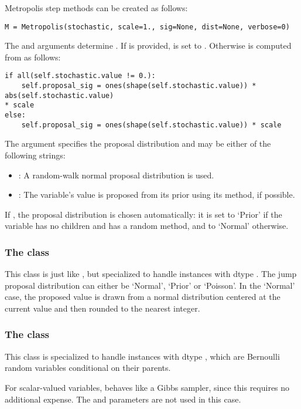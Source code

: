 Metropolis step methods can be created as follows:
\begin{verbatim}
M = Metropolis(stochastic, scale=1., sig=None, dist=None, verbose=0)
\end{verbatim}
The  and  arguments determine . If  is provided,  is set to . Otherwise  is computed from  as follows:
\begin{verbatim}
if all(self.stochastic.value != 0.):
    self.proposal_sig = ones(shape(self.stochastic.value)) * abs(self.stochastic.value) 
* scale
else:
    self.proposal_sig = ones(shape(self.stochastic.value)) * scale
\end{verbatim}

The  argument specifies the proposal distribution and may be either of the following strings:
\begin{itemize}
    \item {}: A random-walk normal proposal distribution is used.
    \item {}: The variable's value is proposed from its prior using its  method, if possible.
\end{itemize}
If , the proposal distribution is chosen automatically: 
it is set to `Prior' if the variable has no children and has a random
method, and to `Normal' otherwise. 

\subsubsection[The DiscreteMetropolis class]{The
 class}
This class is just like , but specialized to handle
 instances with dtype . The jump proposal
distribution can either be `Normal', `Prior' or `Poisson'. In the
`Normal' case, the proposed value is drawn from a normal distribution
centered at the current value and then rounded to the
nearest integer.

\subsubsection[The BinaryMetropolis class]{The
 class} 
This class is specialized to handle  instances with dtype , which are Bernoulli random variables conditional on their parents. 

For scalar-valued variables,  behaves like a Gibbs sampler, since this requires no additional expense. The  and  parameters are not used in this case.

